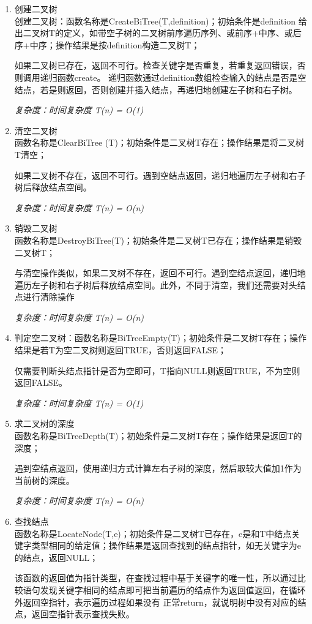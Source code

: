 \documentclass[supercite]{Experimental_Report}
\theoremstyle{definition}
\begin{document}
\begin{enumerate}
	\item 创建二叉树\\
	创建二叉树：函数名称是CreateBiTree(T,definition)；初始条件是definition 给出二叉树T的定义，如带空子树的二叉树前序遍历序列、或前序+中序、或后序+中序；操作结果是按definition构造二叉树T；
	
	如果二叉树已存在，返回不可行。检查关键字是否重复，若重复返回错误，否则调用递归函数create。
	递归函数通过definition数组检查输入的结点是否是空结点，若是则返回，否则创建并插入结点，再递归地创建左子树和右子树。
	
	\emph{复杂度：时间复杂度 T(n) = O(1)}
	\item 清空二叉树\\
	函数名称是ClearBiTree (T)；初始条件是二叉树T存在；操作结果是将二叉树T清空；
	
	如果二叉树不存在，返回不可行。遇到空结点返回，递归地遍历左子树和右子树后释放结点空间。
	
	\emph{复杂度：时间复杂度 T(n) = O(n)}
	\item 销毁二叉树\\
	函数名称是DestroyBiTree(T)；初始条件是二叉树T已存在；操作结果是销毁二叉树T；
	
	与清空操作类似，如果二叉树不存在，返回不可行。遇到空结点返回，递归地遍历左子树和右子树后释放结点空间。此外，不同于清空，我们还需要对头结点进行清除操作
	
\emph{复杂度：时间复杂度 T(n) = O(n)}
	\item 判定空二叉树：函数名称是BiTreeEmpty(T)；初始条件是二叉树T存在；操作结果是若T为空二叉树则返回TRUE，否则返回FALSE；
	
	仅需要判断头结点指针是否为空即可，T指向NULL则返回TRUE，不为空则返回FALSE。
	
	\emph{复杂度：时间复杂度 T(n) = O(1)}
	\item 求二叉树的深度\\
	函数名称是BiTreeDepth(T)；初始条件是二叉树T存在；操作结果是返回T的深度；
	
	遇到空结点返回，使用递归方式计算左右子树的深度，然后取较大值加1作为当前树的深度。
	
	\emph{复杂度：时间复杂度 T(n) = O(n)}
	\item 查找结点\\
	函数名称是LocateNode(T,e)；初始条件是二叉树T已存在，e是和T中结点关键字类型相同的给定值；操作结果是返回查找到的结点指针，如无关键字为e的结点，返回NULL；
	
	该函数的返回值为指针类型，在查找过程中基于关键字的唯一性，所以通过比较语句发现关键字相同的结点即可把当前遍历的结点作为返回值返回，在循环外返回空指针，表示遍历过程如果没有
	正常return，就说明树中没有对应的结点，返回空指针表示查找失败。
	

\end{enumerate}
\end{document}
